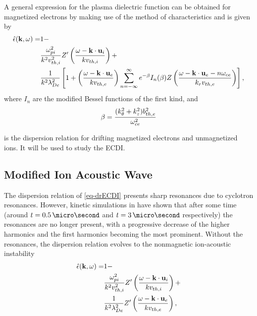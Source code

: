     \vspace{1em}
    A general expression for the plasma dielectric function can be obtained for magnetized electrons by making use of the method of characteristics and is given by
    \begin{equation} \label{eq-drECDI}
      \begin{split}
      \hat\epsilon({\mathbf k},\omega) =& 1 - \\
       &\frac{\omega_{pi}^2}{k^2 v^2_{th, i}} Z'\left( \frac{\omega - {\mathbf k} \cdot {\mathbf u_{i}}}{k v_{th, i}}  \right) + \\
       & \frac{1}{k^2 \lambda_{De}^2} \left[ 1 + \left(  \frac{\omega - {\mathbf k} \cdot {\mathbf u_{e}}}{k v_{th, e}} \right) \sum_{n=-\infty}^{\infty} e^{- \beta} I_n(\beta) Z\left(  \frac{\omega - {\mathbf k} \cdot {\mathbf u_{e} - n \ensuremath{\omega_{ce}}}}{k_{r} v_{th, e}} \right)  \right],
    \end{split}
    \end{equation}
    where $I_n$ are the modified Bessel functions of the first kind, and 
    \begin{equation} \label{eq-beta}
      \beta = \frac{(k_{\theta}^2 + k_z^2) b^2_{th, e}}{ \omega_{ce}^2}
    \end{equation}
    
     is the dispersion relation for drifting magnetized electrons and unmagnetized ions.
    It will be used to study the \acf{ECDI}.
    


  \subsection{Modified Ion Acoustic Wave}
    \label{sucsec-IAW}
    
    The dispersion relation of \cref{eq-drECDI} presents sharp resonances due to cyclotron resonances.
    However, kinetic simulations in \citet{janhunen2018,taccogna2019} have shown that after some time (around  $t=0.5\,\micro\second$ and $t=3\,\micro\second$ respectively) the resonances are no longer present, with a progressive decrease of the higher harmonics and the first harmonics becoming the most prominent.
    Without the resonances, the dispersion relation evolves to the nonmagnetic ion-acoustic instability
    \begin{equation} \label{eq-drIAWgene}
      \begin{split}
      \hat\epsilon({\mathbf k},\omega) =& 1 - \\
       &\frac{\omega_{pi}^2}{k^2 v^2_{th, i}} Z'\left( \frac{\omega - {\mathbf k} \cdot {\mathbf u_{i}}}{k v_{th, i}}  \right) + \\
       & \frac{1}{k^2 \lambda_{De}^2}  Z'\left(  \frac{\omega - {\mathbf k} \cdot {\mathbf u_{e}}}{k v_{th, e}} \right) ,
    \end{split}
    \end{equation}

